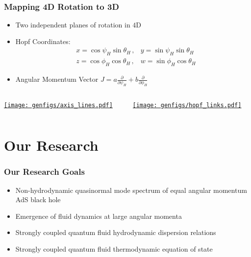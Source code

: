 \documentclass[aspectratio=169, xcolor=dvipsnames]{beamer}
\begin{document}

\begin{frame}[squeeze]
  \frametitle{Mapping 4D Rotation to 3D}
  \begin{itemize}
    \item Two independent planes of rotation in $4$D 
    \item Hopf Coordinates: 
      \begin{align*}
        &x=\cos\psi_H\sin \theta_H\,,&y=\sin \psi_H\sin \theta_H\\
        &z=\cos \phi_H\cos \theta_H\,,&w=\sin \phi_H\cos \theta_H
      \end{align*}
    \item Angular Momentum Vector $J = a\frac\partial{\partial\psi_H} + b\frac\partial{\partial\phi_H}$
  \end{itemize}
  \begin{columns}[c]
    \begin{column}{0.5\paperwidth}
      \href{https://markuspad.com/figures/axis_lines.html}{\texttt{[image: genfigs/axis\_lines.pdf]}}
    \end{column}
    \begin{column}{0.5\paperwidth}
      \href{https://markuspad.com/figures/hopf_links.html}{\texttt{[image: genfigs/hopf\_links.pdf]}}
    \end{column}
  \end{columns}
\end{frame}

\section{Our Research}


\begin{frame}
  \frametitle{Our Research Goals}

  \begin{itemize}
    \item Non-hydrodynamic quasinormal mode spectrum of equal angular momentum AdS black hole
    \item Emergence of fluid dynamics at large angular momenta
    \item Strongly coupled quantum fluid hydrodynamic dispersion relations
    \item Strongly coupled quantum fluid thermodynamic equation of state
  \end{itemize}

\end{frame}
\end{document}

